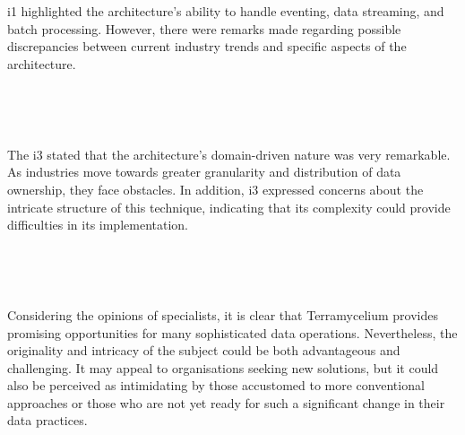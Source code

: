 \documentclass{ieeeaccess}
\begin{document}
\,

\setlength{\fboxsep}{0.3em}

\noindent{}

\,

i1 highlighted the architecture's ability to handle eventing, data streaming, and batch processing. However, there were remarks made regarding possible discrepancies between current industry trends and specific aspects of the architecture.

\,

\setlength{\fboxsep}{0.3em}

\noindent{}

\,

The i3 stated that the architecture's domain-driven nature was very remarkable. As industries move towards greater granularity and distribution of data ownership, they face obstacles. In addition, i3 expressed concerns about the intricate structure of this technique, indicating that its complexity could provide difficulties in its implementation.

\,

\setlength{\fboxsep}{0.3em}

\noindent{}

\,

Considering the opinions of specialists, it is clear that Terramycelium provides promising opportunities for many sophisticated data operations. Nevertheless, the originality and intricacy of the subject could be both advantageous and challenging. It may appeal to organisations seeking new solutions, but it could also be perceived as intimidating by those accustomed to more conventional approaches or those who are not yet ready for such a significant change in their data practices.
\end{document}
